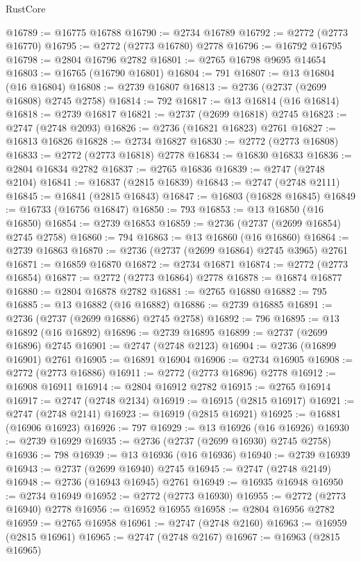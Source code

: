 \begin{lexlean}{RustCore}
\begin{coremodule}
@16789 := @16775 @16788
@16790 := @2734 @16789
@16792 := @2772 (@2773 @16770)
@16795 := @2772 (@2773 @16780) @2778
@16796 := @16792 @16795
@16798 := @2804 @16796 @2782
@16801 := @2765 @16798 @9695 @14654
@16803 := @16765 (@16790 @16801)
@16804 := 791
@16807 := @13 @16804 (@16 @16804)
@16808 := @2739 @16807
@16813 := @2736 (@2737 (@2699 @16808) @2745 @2758)
@16814 := 792
@16817 := @13 @16814 (@16 @16814)
@16818 := @2739 @16817
@16821 := @2737 (@2699 @16818) @2745
@16823 := @2747 (@2748 @2093)
@16826 := @2736 (@16821 @16823) @2761
@16827 := @16813 @16826
@16828 := @2734 @16827
@16830 := @2772 (@2773 @16808)
@16833 := @2772 (@2773 @16818) @2778
@16834 := @16830 @16833
@16836 := @2804 @16834 @2782
@16837 := @2765 @16836
@16839 := @2747 (@2748 @2104)
@16841 := @16837 (@2815 @16839)
@16843 := @2747 (@2748 @2111)
@16845 := @16841 (@2815 @16843)
@16847 := @16803 (@16828 @16845)
@16849 := @16733 (@16756 @16847)
@16850 := 793
@16853 := @13 @16850 (@16 @16850)
@16854 := @2739 @16853
@16859 := @2736 (@2737 (@2699 @16854) @2745 @2758)
@16860 := 794
@16863 := @13 @16860 (@16 @16860)
@16864 := @2739 @16863
@16870 := @2736 (@2737 (@2699 @16864) @2745 @3965) @2761
@16871 := @16859 @16870
@16872 := @2734 @16871
@16874 := @2772 (@2773 @16854)
@16877 := @2772 (@2773 @16864) @2778
@16878 := @16874 @16877
@16880 := @2804 @16878 @2782
@16881 := @2765 @16880
@16882 := 795
@16885 := @13 @16882 (@16 @16882)
@16886 := @2739 @16885
@16891 := @2736 (@2737 (@2699 @16886) @2745 @2758)
@16892 := 796
@16895 := @13 @16892 (@16 @16892)
@16896 := @2739 @16895
@16899 := @2737 (@2699 @16896) @2745
@16901 := @2747 (@2748 @2123)
@16904 := @2736 (@16899 @16901) @2761
@16905 := @16891 @16904
@16906 := @2734 @16905
@16908 := @2772 (@2773 @16886)
@16911 := @2772 (@2773 @16896) @2778
@16912 := @16908 @16911
@16914 := @2804 @16912 @2782
@16915 := @2765 @16914
@16917 := @2747 (@2748 @2134)
@16919 := @16915 (@2815 @16917)
@16921 := @2747 (@2748 @2141)
@16923 := @16919 (@2815 @16921)
@16925 := @16881 (@16906 @16923)
@16926 := 797
@16929 := @13 @16926 (@16 @16926)
@16930 := @2739 @16929
@16935 := @2736 (@2737 (@2699 @16930) @2745 @2758)
@16936 := 798
@16939 := @13 @16936 (@16 @16936)
@16940 := @2739 @16939
@16943 := @2737 (@2699 @16940) @2745
@16945 := @2747 (@2748 @2149)
@16948 := @2736 (@16943 @16945) @2761
@16949 := @16935 @16948
@16950 := @2734 @16949
@16952 := @2772 (@2773 @16930)
@16955 := @2772 (@2773 @16940) @2778
@16956 := @16952 @16955
@16958 := @2804 @16956 @2782
@16959 := @2765 @16958
@16961 := @2747 (@2748 @2160)
@16963 := @16959 (@2815 @16961)
@16965 := @2747 (@2748 @2167)
@16967 := @16963 (@2815 @16965)

\end{coremodule}
\end{lexlean}
